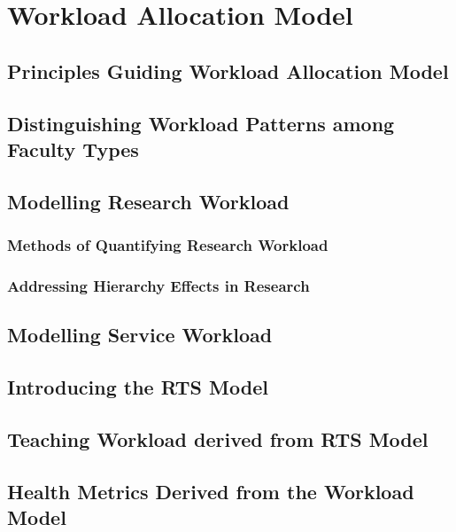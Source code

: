
\chapter{Workload Allocation Model}

\section{Principles Guiding Workload Allocation Model}

\section{Distinguishing Workload Patterns among Faculty Types}

\section{Modelling Research Workload}

\subsection{Methods of Quantifying Research Workload}

\subsection{Addressing Hierarchy Effects in Research}

\section{Modelling Service Workload}

\section{Introducing the RTS Model}

\section{Teaching Workload derived from RTS Model}

\section{Health Metrics Derived from the Workload Model}
